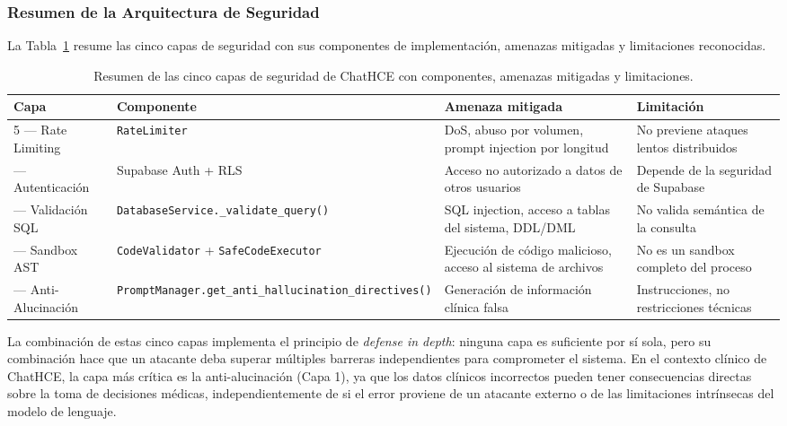 \subsubsection{Resumen de la Arquitectura de Seguridad}

La Tabla~\ref{tab:security_summary} resume las cinco capas de seguridad con sus componentes de implementación, amenazas mitigadas y limitaciones reconocidas.

\begin{table}[t]
\centering
\caption{Resumen de las cinco capas de seguridad de ChatHCE con componentes, amenazas mitigadas y limitaciones.}
\label{tab:security_summary}
\footnotesize
\begin{tabularx}{\textwidth}{llXX}
\toprule
\textbf{Capa} & \textbf{Componente} & \textbf{Amenaza mitigada} & \textbf{Limitación} \\
\midrule
5 — Rate Limiting & \texttt{RateLimiter} & DoS, abuso por volumen, prompt injection por longitud & No previene ataques lentos distribuidos \\
\addlinespace
4 — Autenticación & Supabase Auth + RLS & Acceso no autorizado a datos de otros usuarios & Depende de la seguridad de Supabase \\
\addlinespace
3 — Validación SQL & \texttt{DatabaseService.\_validate\_query()} & SQL injection, acceso a tablas del sistema, DDL/DML & No valida semántica de la consulta \\
\addlinespace
2 — Sandbox AST & \texttt{CodeValidator} + \texttt{SafeCodeExecutor} & Ejecución de código malicioso, acceso al sistema de archivos & No es un sandbox completo del proceso \\
\addlinespace
1 — Anti-Alucinación & \texttt{PromptManager.get\_anti\_hallucination\_directives()} & Generación de información clínica falsa & Instrucciones, no restricciones técnicas \\
\bottomrule
\end{tabularx}
\end{table}

La combinación de estas cinco capas implementa el principio de \textit{defense in depth}: ninguna capa es suficiente por sí sola, pero su combinación hace que un atacante deba superar múltiples barreras independientes para comprometer el sistema. En el contexto clínico de ChatHCE, la capa más crítica es la anti-alucinación (Capa 1), ya que los datos clínicos incorrectos pueden tener consecuencias directas sobre la toma de decisiones médicas, independientemente de si el error proviene de un atacante externo o de las limitaciones intrínsecas del modelo de lenguaje.


